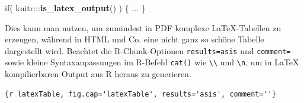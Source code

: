 \documentclass[]{book}
\makeatletter
\newenvironment{Shaded}{\begin{snugshade}}{\end{snugshade}}
\newcommand{\KeywordTok}[1]{\textcolor[rgb]{0.13,0.29,0.53}{\textbf{{#1}}}}
\newcommand{\NormalTok}[1]{{#1}}
\newenvironment{kframe}{%
\medskip{}
\setlength{\fboxsep}{.8em}
 \def\at@end@of@kframe{}%
 \ifinner\ifhmode%
  \def\at@end@of@kframe{\end{minipage}}%
  \begin{minipage}{\columnwidth}%
 \fi\fi%
 \def\FrameCommand##1{\hskip\@totalleftmargin \hskip-\fboxsep
 \colorbox{shadecolor}{##1}\hskip-\fboxsep
     \hskip-\linewidth \hskip-\@totalleftmargin \hskip\columnwidth}%
 \MakeFramed {\advance\hsize-\width
   \@totalleftmargin\z@ \linewidth\hsize
   \@setminipage}}%
 {\par\unskip\endMakeFramed%
 \at@end@of@kframe}
\renewenvironment{Shaded}{\begin{kframe}}{\end{kframe}}
\theoremstyle{definition}
\theoremstyle{definition}
\theoremstyle{remark}
\makeatother
\begin{document}
\begin{Shaded}
\begin{Highlighting}[]
\NormalTok{if( knitr:::}\KeywordTok{is_latex_output}\NormalTok{() ) \{ ... \}}
\end{Highlighting}
\end{Shaded}

Dies kann man nutzen, um zumindest in PDF komplexe LaTeX-Tabellen zu
erzeugen, während in HTML und Co. eine nicht ganz so schöne Tabelle
dargestellt wird. Beachtet die R-Chunk-Optionen
\texttt{results=\textquotesingle{}asis} und
\texttt{comment=\textquotesingle{}\textquotesingle{}} sowie kleine
Syntaxanpassungen im R-Befehl \texttt{cat()} wie
\texttt{\textbackslash{}\textbackslash{}} und
\texttt{\textbackslash{}n}, um in LaTeX kompilierbaren Output aus R
heraus zu generieren.

\begin{verbatim}
{r latexTable, fig.cap='latexTable', results='asis', comment=''}
\end{verbatim}
\end{document}
